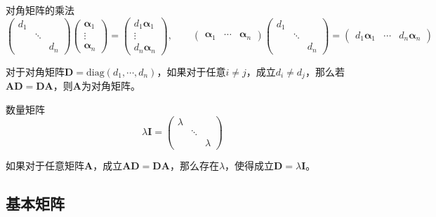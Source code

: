\documentclass[lang = cn, scheme = chinese, thmcnt = section]{elegantbook}
\newcommand{\bs}{\boldsymbol}          %
\begin{document}
\begin{proposition}{对角矩阵的乘法}
	$$
	\begin{pmatrix}
		d_1 & & \\
		& \ddots & \\
		& & d_n
	\end{pmatrix}
	\begin{pmatrix}
		\bs{\alpha}_1 \\ \vdots \\ \bs{\alpha}_n
	\end{pmatrix}
	=\begin{pmatrix}
		d_1\bs{\alpha}_1 \\ \vdots \\ d_n\bs{\alpha}_n
	\end{pmatrix},\qquad 
	\begin{pmatrix}
		\bs{\alpha}_1 & \cdots & \bs{\alpha}_n
	\end{pmatrix}
	\begin{pmatrix}
		d_1 & & \\
		& \ddots & \\
		& & d_n
	\end{pmatrix}=
	\begin{pmatrix}
		d_1\bs{\alpha}_1 & \cdots & d_n\bs{\alpha}_n
	\end{pmatrix}
	$$
\end{proposition}

\begin{proposition}
	对于对角矩阵$\bs{D}=\text{diag}(d_1,\cdots,d_n)$，如果对于任意$i\ne j$，成立$d_i\ne d_j$，那么若$\bs{A}\bs{D}=\bs{D}\bs{A}$，则$\bs{A}$​为对角矩阵。
\end{proposition}

\begin{definition}{数量矩阵}
	$$
	\lambda \bs{I}=\begin{pmatrix}
		\lambda & & \\
		& \ddots & \\
		& & \lambda
	\end{pmatrix}
	$$
\end{definition}

\begin{proposition}
	如果对于任意矩阵$\bs{A}$，成立$\bs{A}\bs{D}=\bs{D}\bs{A}$，那么存在$\lambda$，使得成立$\bs{D}=\lambda \bs{I}$。
\end{proposition}

\subsection{基本矩阵}
\end{document}
